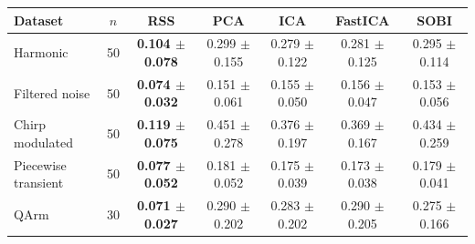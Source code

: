 \begin{tabular}{lcccccc}
\hline
Dataset & $n$ & RSS & PCA & ICA & FastICA & SOBI \\
\hline
Harmonic & 50 & \textbf{0.104 $\pm$ 0.078} & 0.299 $\pm$ 0.155 & 0.279 $\pm$ 0.122 & 0.281 $\pm$ 0.125 & 0.295 $\pm$ 0.114 \\
Filtered noise & 50 & \textbf{0.074 $\pm$ 0.032} & 0.151 $\pm$ 0.061 & 0.155 $\pm$ 0.050 & 0.156 $\pm$ 0.047 & 0.153 $\pm$ 0.056 \\
Chirp modulated & 50 & \textbf{0.119 $\pm$ 0.075} & 0.451 $\pm$ 0.278 & 0.376 $\pm$ 0.197 & 0.369 $\pm$ 0.167 & 0.434 $\pm$ 0.259 \\
Piecewise transient & 50 & \textbf{0.077 $\pm$ 0.052} & 0.181 $\pm$ 0.052 & 0.175 $\pm$ 0.039 & 0.173 $\pm$ 0.038 & 0.179 $\pm$ 0.041 \\
QArm & 30 & \textbf{0.071 $\pm$ 0.027} & 0.290 $\pm$ 0.202 & 0.283 $\pm$ 0.202 & 0.290 $\pm$ 0.205 & 0.275 $\pm$ 0.166 \\
\hline
\end{tabular}